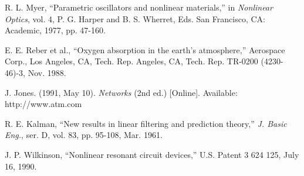\documentclass[a4paper, 10pt]{IEEEtran}
\begin{document}
\begin{thebibliography}{99}
\label{references}

	R. L. Myer, ``Parametric oscillators and nonlinear materials,'' in \textit{Nonlinear Optics}, vol. 4, P. G. Harper and B. S. Wherret, Eds. San Francisco, CA: Academic, 1977, pp. 47-160.

	E. E. Reber et al., ``Oxygen absorption in the earth’s atmosphere,'' Aerospace Corp., Los Angeles, CA, Tech. Rep. Angeles, CA, Tech. Rep. TR-0200 (4230-46)-3, Nov. 1988.

	J. Jones. (1991, May 10). \textit{Networks} (2nd ed.) [Online]. Available: http://www.atm.com

	 R. E. Kalman, ``New results in linear filtering and prediction theory,'' \textit{J. Basic Eng.}, ser. D, vol. 83, pp. 95-108, Mar. 1961.

	J. P. Wilkinson, “Nonlinear resonant circuit devices,” U.S. Patent 3 624 125, July 16, 1990.


\end{thebibliography}
\end{document}
